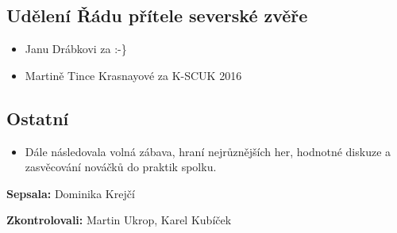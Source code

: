 \documentclass[11pt,a4paper]{article}
\begin{document}
\subsection*{Udělení Řádu přítele severské zvěře}
\begin{itemize}[itemsep=0pt]
\item Janu Drábkovi za  :-\}
\item Martině Tince Krasnayové za K-SCUK 2016
\end{itemize}

\subsection*{Ostatní}
\begin{itemize}[itemsep=0pt]
\item Dále následovala volná zábava, hraní nejrůznějších her, hodnotné diskuze a zasvěcování nováčků do praktik spolku.
\end{itemize}

\textbf{Sepsala:} Dominika Krejčí

\textbf{Zkontrolovali:} Martin Ukrop, Karel Kubíček
\end{document}
